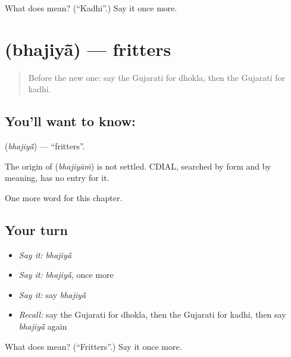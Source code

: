 \begin{tcolorbox}[breakable,colback=teal!4,colframe=teal!35!black,title={Before you move on}]
What does  mean? (\textquotedblleft{}Kadhi\textquotedblright{}.) Say it once more.
\end{tcolorbox}
\section[\texorpdfstring{\gu{ભજિયાં} (bhajiyā̃)}{ભજિયાં (bhajiyā̃)}]{ (bhajiyā̃) — fritters}

\label{lesson:GU-C117-bhajiya}



\begin{quote}
Before the new one: say the Gujarati for dhokla, then the Gujarati for kadhi.
\end{quote}

\subsection*{You'll want to know: }
\textbf{} (\emph{bhajiyā̃}) — \textquotedblleft{}fritters\textquotedblright{}.

\begin{cousinweb}
The origin of \textbf{} (\emph{bhajiyāṁ}) is not settled. CDIAL, searched by form and by meaning, has no entry for it.
\end{cousinweb}

\begin{grammarlens}[title={What you've built}]
One more word for this chapter.
\end{grammarlens}

\subsection*{Your turn}
\begin{itemize}
\raggedright
  \item \emph{Say it:} \emph{bhajiyā̃}
  \item \emph{Say it:} \emph{bhajiyā̃}, once more
  \item \emph{Say it:} say \emph{bhajiyā̃}
  \item \emph{Recall:} say the Gujarati for dhokla, then the Gujarati for kadhi, then say \emph{bhajiyā̃} again
\end{itemize}

\begin{tcolorbox}[breakable,colback=teal!4,colframe=teal!35!black,title={Before you move on}]
What does  mean? (\textquotedblleft{}Fritters\textquotedblright{}.) Say it once more.
\end{tcolorbox}
